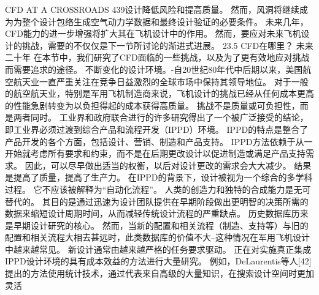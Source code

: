 \documentclass[UTF8,11pt,a4paper,openany,fontset=fandol]{ctexbook}
\begin{document}
CFD AT A CROSSROADS 439设计降低风险和提高质量。 然而，风洞将继续成为为整个设计包络生成空气动力学数据和最终设计验证的必要条件。 未来几年，CFD能力的进一步增强将扩大其在飞机设计中的作用。 然而，要应对未来飞机设计的挑战，需要的不仅仅是下一节所讨论的渐进式进展。 23.5 CFD在哪里？ 未来二十年 在本节中，我们研究了CFD面临的一些挑战，以及为了更有效地应对挑战而需要追求的途径。 不断变化的设计环境。-自20世纪80年代中后期以来，美国航空航天业一直严重关注在竞争日益激烈的全球市场中保持其领导地位。 对于一般的航空航天业，特别是军用飞机制造商来说，飞机设计的挑战已经从任何成本更高的性能急剧转变为以负担得起的成本获得高质量。 挑战不是质量或可负担性，而是两者同时。 工业界和政府联合进行的许多研究得出了一个被广泛接受的结论，即工业界必须过渡到综合产品和流程开发（IPPD）环境。 IPPD的特点是整合了产品开发的各个方面，包括设计、营销、制造和产品支持。 IPPD方法依赖于从一开始就考虑所有要求和约束，而不是在后期更改设计以促进制造或满足产品支持需求。 因此，可以尽早做出适当的权衡，以后对设计更改的需求会大大减少。 结果是提高了质量，提高了生产力。 在IPPD的背景下，设计被视为一个综合的多学科过程。 它不应该被解释为“自动化流程”。 人类的创造力和独特的合成能力是无可替代的。 其目的是通过迅速为设计团队提供在早期阶段做出更明智的决策所需的数据来缩短设计周期时间，从而减轻传统设计流程的严重缺点。 历史数据库历来是早期设计研究的核心。 然而，当新的配置和相关流程（制造、支持等）与旧的配置和相关流程大相去甚远时，此类数据库的价值不大--这种情况在军用飞机设计中越来越常见。 新设计通常由越来越严格的任务要求驱动。 正在对实施真正集成IPPD设计环境的具有成本效益的方法进行大量研究。 例如，DeLaurentis等人[42]提出的方法使用统计技术，通过代表来自高级的大量知识，在搜索设计空间时更加灵活
\end{document}
